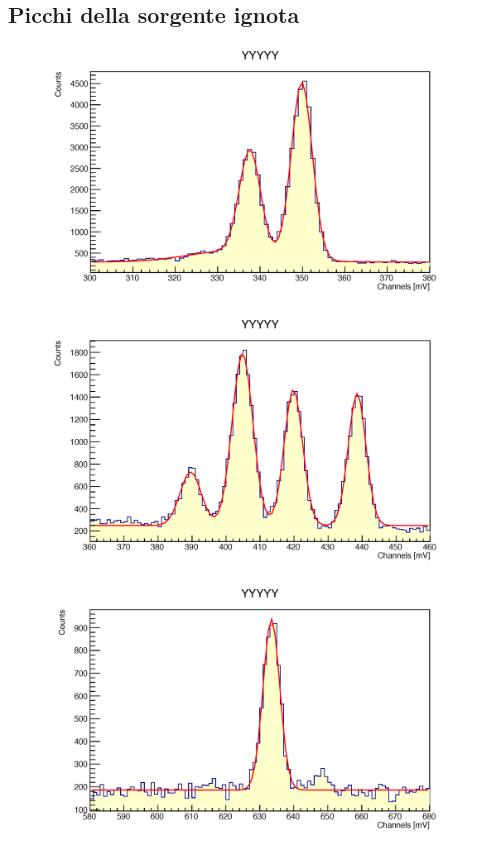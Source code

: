 \documentclass[a4paper,10pt]{article}
\begin{document}
\subsection{Picchi della sorgente ignota}
\begin{figure}[H]
    \centering
    \includegraphics[scale=0.45]{appendice/y1}
\end{figure}
\begin{figure}[H]
    \centering
    \includegraphics[scale=0.45]{appendice/y8}
\end{figure}
\begin{figure}[H]
    \centering
    \includegraphics[scale=0.45]{appendice/y9}
\end{figure}
\end{document}
